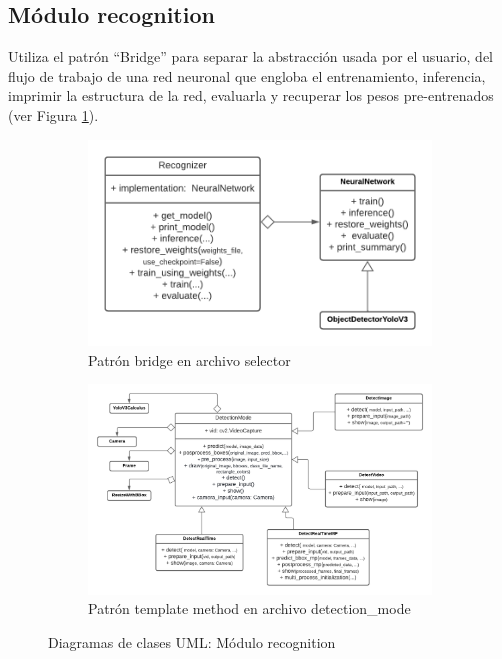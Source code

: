 \subsection{Módulo recognition}
Utiliza el patrón ``Bridge'' para separar la abstracción usada por el usuario, del flujo de trabajo de una red neuronal que engloba el entrenamiento, inferencia, imprimir la estructura de la red, evaluarla y recuperar los pesos pre-entrenados (ver Figura \ref{bridge_uml}).
\begin{figure}[H]
     \centering
     \begin{subfigure}[b]{0.4\textwidth}
        \centering
        \includegraphics[scale=0.4]{Recursos/bridge_uml.png}
        \caption{Patrón bridge en archivo selector}
        \label{bridge_uml}
     \end{subfigure}
     \hspace{1em}
     \begin{subfigure}[b]{0.4\textwidth}
         \centering
        \includegraphics[scale=0.4]{Recursos/template_method_uml.png}
        \caption{Patrón template method en archivo detection\_mode}
        \label{template_method_uml}
     \end{subfigure}
     \hspace{1em}
\caption{Diagramas de clases UML: Módulo recognition}
\label{recognition_umls}
\end{figure}
